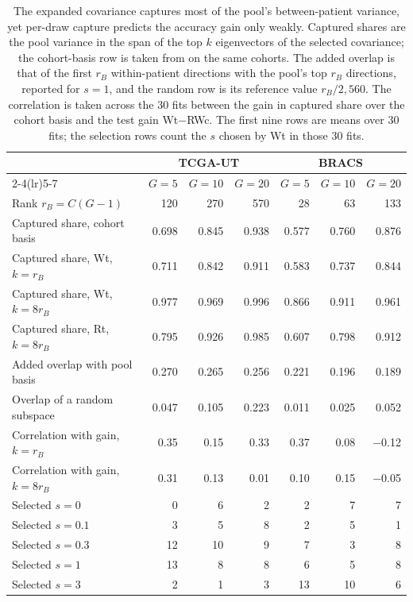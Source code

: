 \begin{table}[htbp]
\centering
\small
\renewcommand{\arraystretch}{1.15}
\begin{tabular}{@{}lrrrrrr@{}}
\toprule
 & \multicolumn{3}{c}{TCGA-UT} & \multicolumn{3}{c}{BRACS} \\
\cmidrule(lr){2-4}\cmidrule(lr){5-7}
 & $G=5$ & $G=10$ & $G=20$ & $G=5$ & $G=10$ & $G=20$ \\
\midrule
Rank $r_B=C(G-1)$ & 120 & 270 & 570 & 28 & 63 & 133 \\
Captured share, cohort basis & 0.698 & 0.845 & 0.938 & 0.577 & 0.760 & 0.876 \\
Captured share, Wt, $k=r_B$ & 0.711 & 0.842 & 0.911 & 0.583 & 0.737 & 0.844 \\
Captured share, Wt, $k=8r_B$ & 0.977 & 0.969 & 0.996 & 0.866 & 0.911 & 0.961 \\
Captured share, Rt, $k=8r_B$ & 0.795 & 0.926 & 0.985 & 0.607 & 0.798 & 0.912 \\
Added overlap with pool basis & 0.270 & 0.265 & 0.256 & 0.221 & 0.196 & 0.189 \\
Overlap of a random subspace & 0.047 & 0.105 & 0.223 & 0.011 & 0.025 & 0.052 \\
Correlation with gain, $k=r_B$ & 0.35 & 0.15 & 0.33 & 0.37 & 0.08 & $-$0.12 \\
Correlation with gain, $k=8r_B$ & 0.31 & 0.13 & 0.01 & 0.10 & 0.15 & $-$0.05 \\
\addlinespace
Selected $s=0$ & 0 & 6 & 2 & 2 & 7 & 7 \\
Selected $s=0.1$ & 3 & 5 & 8 & 2 & 5 & 1 \\
Selected $s=0.3$ & 12 & 10 & 9 & 7 & 3 & 8 \\
Selected $s=1$ & 13 & 8 & 8 & 6 & 5 & 8 \\
Selected $s=3$ & 2 & 1 & 3 & 13 & 10 & 6 \\
\bottomrule
\end{tabular}
\caption{The expanded covariance captures most of the pool's between-patient variance, yet per-draw capture predicts the accuracy gain only weakly. Captured shares are the pool variance in the span of the top $k$ eigenvectors of the selected covariance; the cohort-basis row is taken from \citet{queisler2026spectrumRegularization} on the same cohorts. The added overlap is that of the first $r_B$ within-patient directions with the pool's top $r_B$ directions, reported for $s=1$, and the random row is its reference value $r_B/2{,}560$. The correlation is taken across the 30 fits between the gain in captured share over the cohort basis and the test gain Wt$-$RWc. The first nine rows are means over 30 fits; the selection rows count the $s$ chosen by Wt in those 30 fits.}
\label{tab:diagnostics}
\end{table}

